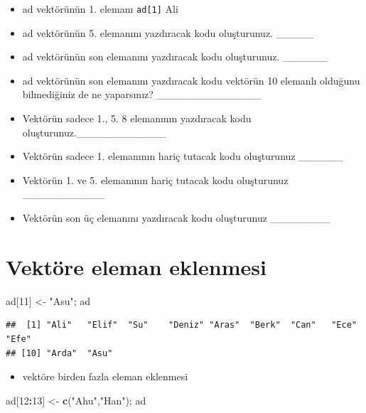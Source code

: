 \documentclass[
  oneside]{book}
\newenvironment{Shaded}{\begin{snugshade}}{\end{snugshade}}
\newcommand{\DecValTok}[1]{\textcolor[rgb]{0.00,0.00,0.81}{#1}}
\newcommand{\FunctionTok}[1]{\textcolor[rgb]{0.13,0.29,0.53}{\textbf{#1}}}
\newcommand{\NormalTok}[1]{#1}
\newcommand{\OtherTok}[1]{\textcolor[rgb]{0.56,0.35,0.01}{#1}}
\newcommand{\SpecialCharTok}[1]{\textcolor[rgb]{0.81,0.36,0.00}{\textbf{#1}}}
\newcommand{\StringTok}[1]{\textcolor[rgb]{0.31,0.60,0.02}{#1}}
\providecommand{\tightlist}{%
  \setlength{\itemsep}{0pt}\setlength{\parskip}{0pt}}
\begin{document}
\begin{itemize}
\item
  ad vektörünün 1. elemanı \texttt{ad{[}1{]}} Ali
\item
  ad vektörünün 5. elemanını yazdıracak kodu oluşturunuz. \_\_\_\_\_
\item
  ad vektörünün son elemanını yazdıracak kodu oluşturunuz. \_\_\_\_\_\_
\item
  ad vektörünün son elemanını yazdıracak kodu vektörün 10 elemanlı olduğunu bilmediğiniz de ne yaparsınız? \_\_\_\_\_\_\_\_\_\_\_\_\_\_
\item
  Vektörün sadece 1., 5. 8 elemanının yazdıracak kodu oluşturunuz.\_\_\_\_\_\_\_\_\_\_\_\_
\item
  Vektörün sadece 1. elemanının hariç tutacak kodu oluşturunuz \_\_\_\_\_\_
\item
  Vektörün 1. ve 5. elemanının hariç tutacak kodu oluşturunuz \_\_\_\_\_\_\_\_\_\_\_
\item
  Vektörün son üç elemanını yazdıracak kodu oluşturunuz \_\_\_\_\_\_\_\_
\end{itemize}

\hypertarget{vektuxf6re-eleman-eklenmesi}{%
\section{Vektöre eleman eklenmesi}\label{vektuxf6re-eleman-eklenmesi}}

\begin{Shaded}
\begin{Highlighting}[]
\NormalTok{ad[}\DecValTok{11}\NormalTok{] }\OtherTok{\textless{}{-}} \StringTok{"Asu"}\NormalTok{; ad}
\end{Highlighting}
\end{Shaded}

\begin{verbatim}
##  [1] "Ali"   "Elif"  "Su"    "Deniz" "Aras"  "Berk"  "Can"   "Ece"   "Efe"  
## [10] "Arda"  "Asu"
\end{verbatim}

\begin{itemize}
\tightlist
\item
  vektöre birden fazla eleman eklenmesi
\end{itemize}

\begin{Shaded}
\begin{Highlighting}[]
\NormalTok{ad[}\DecValTok{12}\SpecialCharTok{:}\DecValTok{13}\NormalTok{] }\OtherTok{\textless{}{-}} \FunctionTok{c}\NormalTok{(}\StringTok{"Ahu"}\NormalTok{,}\StringTok{"Han"}\NormalTok{); ad}
\end{Highlighting}
\end{Shaded}
\end{document}
